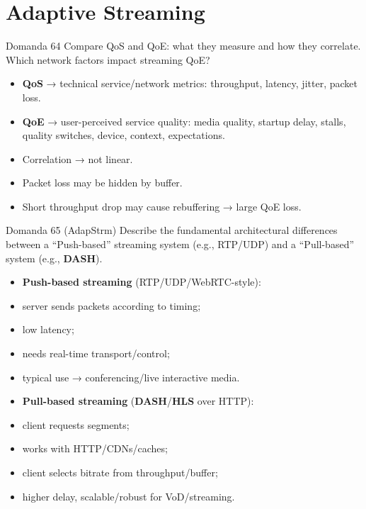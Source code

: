 \section{Adaptive Streaming}




\begin{questionbox}{Domanda 64}
Compare QoS and QoE: what they measure and how they correlate. Which network factors impact streaming QoE?
\end{questionbox}


\begin{itemize}
  \item \textbf{QoS} → technical service/network metrics: throughput, latency, jitter, packet loss.
  \item \textbf{QoE} → user-perceived service quality: media quality, startup delay, stalls, quality switches, device, context, expectations.
  \item Correlation → not linear.
  \item Packet loss may be hidden by buffer.
  \item Short throughput drop may cause rebuffering → large QoE loss.
\end{itemize}



\begin{questionbox}{Domanda 65}
(AdapStrm) Describe the fundamental architectural differences between a “Push-based” streaming system (e.g., RTP/UDP) and a “Pull-based” system (e.g., \textbf{DASH}).
\end{questionbox}


\begin{itemize}
  \item \textbf{Push-based streaming} (RTP/UDP/WebRTC-style):
  \item server sends packets according to timing;
  \item low latency;
  \item needs real-time transport/control;
  \item typical use → conferencing/live interactive media.
  \item \textbf{Pull-based streaming} (\textbf{DASH}/\textbf{HLS} over HTTP):
  \item client requests segments;
  \item works with HTTP/CDNs/caches;
  \item client selects bitrate from throughput/buffer;
  \item higher delay, scalable/robust for VoD/streaming.
\end{itemize}



